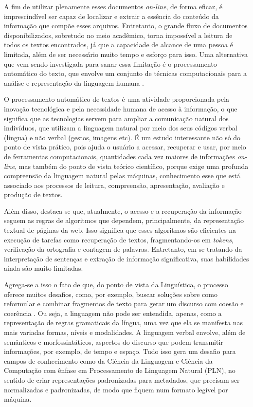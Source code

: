 \documentclass[portuguese]{textolivre}
\begin{document}
A fim de utilizar plenamente esses documentos \textit{on-line}, de forma eficaz, é imprescindível ser capaz de localizar e extrair a essência do conteúdo da informação que compõe esses arquivos. Entretanto, o grande fluxo de documentos disponibilizados, sobretudo no meio acadêmico, torna impossível a leitura de todos os textos encontrados, já que a capacidade de alcance de uma pessoa é limitada, além de ser necessário muito tempo e esforço para isso. Uma alternativa que vem sendo investigada para sanar essa limitação é o processamento automático do texto, que envolve um conjunto de técnicas computacionais para a análise e representação da linguagem humana \cite{cambria_jumping_2014}.

O processamento automático de textos é uma atividade proporcionada pela inovação tecnológica e pela necessidade humana de acesso à informação, o que significa que as tecnologias servem para ampliar a comunicação natural dos indivíduos, que utilizam a linguagem natural por meio dos seus códigos verbal (língua) e não verbal (gestos, imagens etc).  É um estudo interessante não só do ponto de vista prático, pois ajuda o usuário a acessar, recuperar e usar, por meio de ferramentas computacionais, quantidades cada vez maiores de informações \textit{on-line}, mas também do ponto de vista teórico científico, porque exige uma profunda compreensão da linguagem natural pelas máquinas, conhecimento esse que está associado aos processos de leitura, compreensão, apresentação, avaliação e produção de textos.

Além disso, destaca-se que, atualmente, o acesso e a recuperação da informação seguem as regras de algoritmos que dependem, principalmente, da representação textual de páginas da web. Isso significa que esses algoritmos são eficientes na execução de tarefas como recuperação de textos, fragmentando-os em \textit{tokens}, verificação da ortografia e contagem de palavras. Entretanto, em se tratando da interpretação de sentenças e extração de informação significativa, suas habilidades ainda são muito limitadas.

Agrega-se a isso o fato de que, do ponto de vista da Linguística, o processo oferece muitos desafios, como, por exemplo, buscar soluções sobre como reformular e combinar fragmentos de texto para gerar um discurso com coesão e coerência \cite{jones_automatic_2007}. Ou seja, a linguagem não pode ser entendida, apenas, como a representação de regras gramaticais da língua, uma vez que ela se manifesta nas mais variadas formas, níveis e modalidades. A linguagem verbal envolve, além de semânticos e morfossintáticos, aspectos do discurso que podem transmitir informações, por exemplo, de tempo e espaço. Tudo isso gera um desafio para campos de conhecimento como da Ciência da Linguagem e Ciência da Computação com ênfase em Processamento de Linguagem Natural (PLN), no sentido de criar representações padronizadas para metadados, que precisam ser normalizadas e padronizadas, de modo que fiquem num formato legível por máquina.
\end{document}
